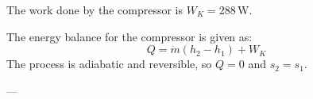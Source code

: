 The work done by the compressor is \( W_K = 288 \, \text{W} \).  

The energy balance for the compressor is given as:  
\[
Q = \dot{m} \left( h_2 - h_1 \right) + W_K
\]  
The process is adiabatic and reversible, so \( Q = 0 \) and \( s_2 = s_1 \).  

---
